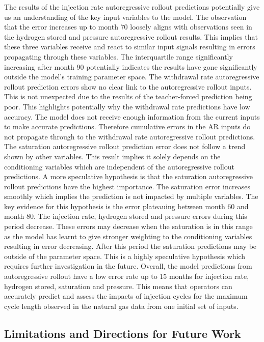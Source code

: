 The results of the injection rate autoregressive rollout predictions potentially give us an understanding of the key input variables to the model. The observation that the error increases up to month 70 loosely aligns with observations seen in the hydrogen stored and pressure autoregressive rollout results. This implies that these three variables receive and react to similar input signals resulting in errors propagating through these variables. The interquartile range significantly increasing after month 90 potentially indicates the results have gone significantly outside the model's training parameter space. The withdrawal rate autoregressive rollout prediction errors show no clear link to the autoregressive rollout inputs. This is not unexpected due to the results of the teacher-forced prediction being poor. This highlights potentially why the withdrawal rate predictions have low accuracy. The model does not receive enough information from the current inputs to make accurate predictions. Therefore cumulative errors in the AR inputs do not propagate through to the withdrawal rate autoregressive rollout predictions. The saturation autoregressive rollout prediction error does not follow a trend shown by other variables. This result implies it solely depends on the conditioning variables which are independent of the autoregressive rollout predictions. A more speculative hypothesis is that the saturation autoregressive rollout predictions have the highest importance. The saturation error increases smoothly which implies the prediction is not impacted by multiple variables. The key evidence for this hypothesis is the error plateauing between month 60 and month 80. The injection rate, hydrogen stored and pressure errors during this period decrease. These errors may decrease when the saturation is in this range as the model has learnt to give stronger weighting to the conditioning variables resulting in error decreasing. After this period the saturation predictions may be outside of the parameter space. This is a highly speculative hypothesis which requires further investigation in the future. Overall, the model predictions from autoregressive rollout have a low error rate up to 15 months for injection rate, hydrogen stored, saturation and pressure. This means that operators can accurately predict and assess the impacts of injection cycles for the maximum cycle length observed in the natural gas data from one initial set of inputs. 
\FloatBarrier
\subsection{Limitations and Directions for Future Work}

